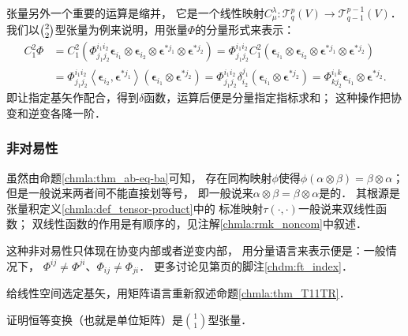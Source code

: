 张量另外一个重要的运算是{\heiti 缩并}，
它是一个线性映射$C^\lambda _\mu : \mathcal{T}^p_q(V) \to \mathcal{T}^{p-1}_{q-1}(V)$．
我们以$\binom{2}{2}$型张量为例来说明，用张量$\Phi$的分量形式来表示：
\begin{align*}
    C^2_1 \Phi & = C^2_1 \left(\Phi^{i_1 i_2} _{j_1 j_2}
    \boldsymbol{\epsilon}_{i_1} \otimes\boldsymbol{\epsilon}_{i_2} \otimes
    \boldsymbol{\epsilon}^{*j_1} \otimes \boldsymbol{\epsilon}^{*j_2}\right)
    = \Phi^{i_1 i_2} _{j_1 j_2} C^2_1 \left(
    \boldsymbol{\epsilon}_{i_1} \otimes\boldsymbol{\epsilon}_{i_2} \otimes
    \boldsymbol{\epsilon}^{*j_1} \otimes \boldsymbol{\epsilon}^{*j_2}\right)  \\
    &= \Phi^{i_1 i_2} _{j_1 j_2} \left<\boldsymbol{\epsilon}_{i_2},\boldsymbol{\epsilon}^{*j_1}\right>
    \left( \boldsymbol{\epsilon}_{i_1}  \otimes \boldsymbol{\epsilon}^{*j_2}\right)
    = \Phi^{i_1 i_2} _{j_1 j_2} \delta^{j_1}_{i_2}
    \left( \boldsymbol{\epsilon}_{i_1}  \otimes \boldsymbol{\epsilon}^{*j_2}\right)
    = \Phi^{i_1 k} _{k j_2}
       \boldsymbol{\epsilon}_{i_1}  \otimes \boldsymbol{\epsilon}^{*j_2} .
\end{align*}
即让指定基矢作配合，得到$\delta$函数，运算后便是分量指定指标求和；
这种操作把协变和逆变各降一阶．

\subsubsection*{非对易性}\label{chmla:sec_noncom}
虽然由命题\ref{chmla:thm_ab-eq-ba}可知，
存在同构映射$\phi$使得$\phi(\alpha \otimes \beta )=\beta \otimes \alpha$；
但是一般说来两者间不能直接划等号，
即一般说来$\alpha \otimes \beta =\beta \otimes \alpha$是的．
其根源是张量积定义\ref{chmla:def_tensor-product}中的
标准映射$\tau(\cdot, \cdot)$一般说来双线性函数；
双线性函数的作用是有顺序的，见注解\ref{chmla:rmk_noncom}中叙述．

这种非对易性只体现在协变内部或者逆变内部，
用分量语言来表示便是：一般情况下，
$\Phi^{ij}\neq \Phi^{ji}$、$\Phi_{ij}\neq \Phi_{ji}$．
更多讨论见第\pageref{chdm:ft_index}页的脚注\ref{chdm:ft_index}．


\begin{exercise}
	给线性空间选定基矢，用矩阵语言重新叙述命题\ref{chmla:thm_T11TR}．
\end{exercise}

\begin{exercise}
	证明恒等变换（也就是单位矩阵）是$\binom{1}{1}$型张量．
\end{exercise}



